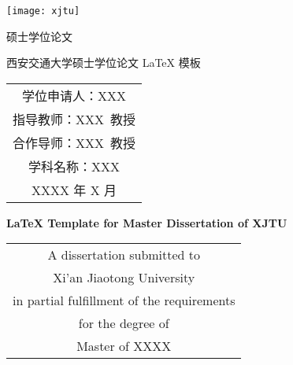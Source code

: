 
\begin{titlepage}
	\begin{center}
		\begin{figure*}[!ht]\vspace{5em}
			\centering
			\texttt{[image: xjtu]}
		\end{figure*}
		
		\vspace{1.5em}
		\begin{center} { 硕士学位论文} \end{center}
		
		\vspace{8.5em}
		\begin{center} {\sanhao\hei 西安交通大学硕士学位论文 \LaTeX{} 模板}\end{center}
		
		\vspace{15em}
		{\sanhao
			\begin{center} \renewcommand{\arraystretch}{1.5}
				\begin{tabular}{c}
					学位申请人：XXX \\
					指导教师：XXX~教授 \\
					合作导师：XXX~教授 \\
					学科名称：XXX \\
					XXXX 年 X 月 \\
				\end{tabular} \renewcommand{\arraystretch}{1}
			\end{center} 
		}
	\end{center}
	\clearpage{\pagestyle{empty}\cleardoublepage}
	
	\newpage\thispagestyle{empty}
	\begin{center}
		\parbox[t][0.7cm][t]{\textwidth}{}
		
		\begin{center}{\sanhao\bfseries \LaTeX{} Template for Master Dissertation of XJTU}\end{center}
		
		\vspace{4.7cm}
		{\sanhao
			\begin{center} \renewcommand{\arraystretch}{1.4}
				\begin{tabular}{c}
					A dissertation submitted to  \\
					Xi'an Jiaotong University \\
					in partial fulfillment of the requirements \\
					for the degree of \\
					Master of XXXX \\
				\end{tabular} \renewcommand{\arraystretch}{1}
			\end{center} 
		}
		

\end{center}
\end{titlepage}
